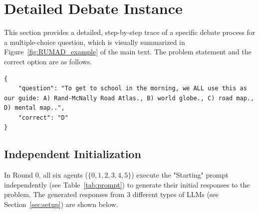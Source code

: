 \section{Detailed Debate Instance}

This section provides a detailed, step-by-step trace of a specific debate process for a multiple-choice question, which is visually summarized in Figure~\ref{fig:RUMAD_example} of the main text. The problem statement and the correct option are as follows.

\begin{lstlisting}[]
{
    "question": "To get to school in the morning, we ALL use this as our guide: A) Rand-McNally Road Atlas., B) world globe., C) road map., D) mental map..",
    "correct": "D"
}
\end{lstlisting}

\subsection{Independent Initialization}

In Round 0, all six agents ($\{0, 1, 2, 3, 4, 5\}$) execute the "Starting" prompt independently (see Table~\ref{tab:prompt}) to generate their initial responses to the problem. The generated responses from 3 different types of LLMs (see Section~\ref{sec:setup}) are shown below.

